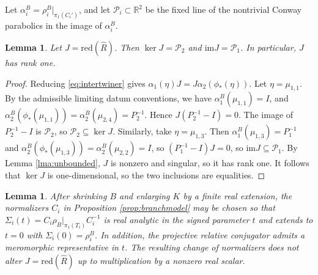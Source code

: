 \documentclass{article}
\newcommand{\im}[1]{\mathrm{im} #1}
\theoremstyle{plain}
\theoremstyle{definition}
\theoremstyle{plain}
\theoremstyle{plain}
\theoremstyle{plain}
\newtheorem{lemma}[theorem]{Lemma}
\theoremstyle{remark}
\theoremstyle{remark}
\theoremstyle{plain}
\theoremstyle{plain}
\theoremstyle{plain}
\theoremstyle{plain}
\begin{document}
Let $\alpha_i^B = \rho_i^B|_{\pi_1(C_i')}$, and let $\mathcal P_i \subset \mathbb R^2$ be the fixed line of the nontrivial Conway parabolics in the image of $\alpha_i^B$. 

\begin{lemma}\label{lma:rankone}
Let $J = \mathrm{red}(\widehat R)$. Then $\ker J = \mathcal P_2$ and $\im J = \mathcal P_1$. In particular, $J$ has rank one.
\end{lemma}

\begin{proof}
Reducing \eqref{eq:intertwiner} gives $\alpha_1(\eta)J = J\alpha_2(\phi_*(\eta))$. Let $\eta=\mu_{1,1}$. By the admissible limiting datum conventions, we have $\alpha_1^B(\mu_{1,1}) = I$, and $\alpha_2^B(\phi_*(\mu_{1,1})) = \alpha_2^B(\mu_{2,4}) = P_2^{-1}$. Hence $J(P_2^{-1}-I) = 0$. The image of $P_2^{-1}-I$ is $\mathcal P_2$, so $\mathcal P_2 \subseteq \ker J$. Similarly, take $\eta = \mu_{1,3}$. Then $\alpha_1^B(\mu_{1,3}) = P_1^{-1}$ and $\alpha_2^B(\phi_*(\mu_{1,3})) = \alpha_2^B(\mu_{2,2}) = I$, so $(P_1^{-1}-I)J = 0 $, so $\im J \subseteq \mathcal P_1$. By Lemma \ref{lma:unbounded}, $J$ is nonzero and singular, so it has rank one. It follows that $\ker J$ is one-dimensional, so the two inclusions are equalities. 
\end{proof}

\begin{lemma}\label{lma:analyticgauge}
After shrinking $B$ and enlarging $K$ by a finite real extension, the normalizers $C_i$ in Proposition \ref{prop:branchmodel} may be chosen so that $\Sigma_i(t) = C_i\rho_B|_{\pi_1(T_i)}C_i^{-1}$ is real analytic in the signed parameter $t$ and extends to $t = 0$ with $\Sigma_i(0) = \rho_i^B$. In addition, the projective relative conjugator admits a meromorphic representative in $t$. The resulting change of normalizers does not alter $J = \mathrm{red}(\widehat R)$ up to multiplication by a nonzero real scalar. 
\end{lemma}
\end{document}
